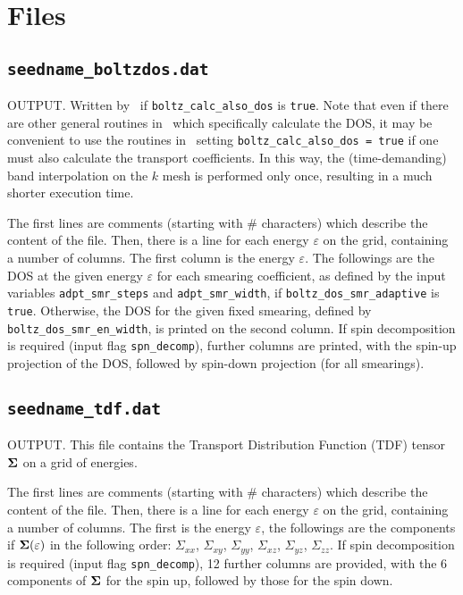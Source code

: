 \section{Files}
\subsection{{\tt seedname\_boltzdos.dat}}
OUTPUT. Written by \postw\ if {\tt boltz\_calc\_also\_dos} is \verb#true#. Note that even if there are other general routines in \postw\ which specifically calculate the DOS, it may be convenient to use the routines in \bw\ setting {\tt boltz\_calc\_also\_dos = true} if one must also calculate the transport coefficients. In this way, the (time-demanding) band interpolation on the $k$ mesh is performed only once, resulting in a much shorter execution time.

The first lines are comments (starting with \# characters) which describe the content of the file.
Then, there is a line for each energy $\varepsilon$ on the grid, containing a number of columns. The first column is the energy $\varepsilon$. The followings are the DOS at the given energy $\varepsilon$ for each smearing coefficient, as defined by the input variables {\tt adpt\_smr\_steps} and {\tt adpt\_smr\_width}, if {\tt boltz\_dos\_smr\_adaptive} is \verb#true#. Otherwise, the DOS for the given fixed smearing, defined by {\tt boltz\_dos\_smr\_en\_width}, is printed on the second column.
If spin decomposition is required (input flag {\tt spn\_decomp}), further columns are printed, with the spin-up projection of the DOS, followed by spin-down projection (for all smearings).

\subsection{{\tt seedname\_tdf.dat}}
OUTPUT. This file contains the Transport Distribution Function (TDF) tensor $\bm{\mathrm{\Sigma}}$ on a grid of energies. 

The first lines are comments (starting with \# characters) which describe the content of the file.
Then, there is a line for each energy $\varepsilon$ on the grid, containing a number of columns. The first is the energy $\varepsilon$, the followings are the components if $\bm{\mathrm{\Sigma}}(\varepsilon)$ in the following order: $\Sigma_{xx}$, $\Sigma_{xy}$, $\Sigma_{yy}$, $\Sigma_{xz}$, $\Sigma_{yz}$, $\Sigma_{zz}$. If spin decomposition is required (input flag {\tt spn\_decomp}), 12 further columns are provided, with the 6 components of $\bm{\mathrm{\Sigma}}$ for the spin up, followed by those for the spin down.

